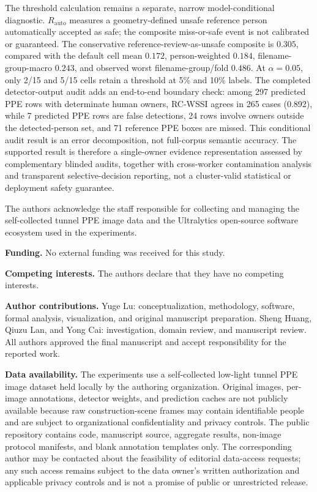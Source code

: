 \documentclass[iicol,pdflatex,sn-mathphys-num]{sn-jnl}
\begin{document}
The threshold calculation remains a separate, narrow model-conditional diagnostic. $R_{\mathrm{auto}}$ measures a geometry-defined unsafe reference person automatically accepted as safe; the composite miss-or-safe event is not calibrated or guaranteed. The conservative reference-review-as-unsafe composite is $0.305$, compared with the default cell mean $0.172$, person-weighted $0.184$, filename-group-macro $0.243$, and observed worst filename-group/fold $0.486$. At $\alpha=0.05$, only 2/15 and 5/15 cells retain a threshold at 5\% and 10\% labels. The completed detector-output audit adds an end-to-end boundary check: among 297 predicted PPE rows with determinate human owners, RC-WSSI agrees in 265 cases (0.892), while 7 predicted PPE rows are false detections, 24 rows involve owners outside the detected-person set, and 71 reference PPE boxes are missed. This conditional audit result is an error decomposition, not full-corpus semantic accuracy. The supported result is therefore a single-owner evidence representation assessed by complementary blinded audits, together with cross-worker contamination analysis and transparent selective-decision reporting, not a cluster-valid statistical or deployment safety guarantee.

\backmatter

The authors acknowledge the staff responsible for collecting and managing the self-collected tunnel PPE image data and the Ultralytics open-source software ecosystem used in the experiments.


\textbf{Funding.} No external funding was received for this study.

\textbf{Competing interests.} The authors declare that they have no competing interests.

\textbf{Author contributions.} Yuge Lu: conceptualization, methodology, software, formal analysis, visualization, and original manuscript preparation. Sheng Huang, Qiuzu Lan, and Yong Cai: investigation, domain review, and manuscript review. All authors approved the final manuscript and accept responsibility for the reported work.

\textbf{Data availability.} The experiments use a self-collected low-light tunnel PPE image dataset held locally by the authoring organization. Original images, per-image annotations, detector weights, and prediction caches are not publicly available because raw construction-scene frames may contain identifiable people and are subject to organizational confidentiality and privacy controls. The public repository contains code, manuscript source, aggregate results, non-image protocol manifests, and blank annotation templates only. The corresponding author may be contacted about the feasibility of editorial data-access requests; any such access remains subject to the data owner's written authorization and applicable privacy controls and is not a promise of public or unrestricted release.
\end{document}
